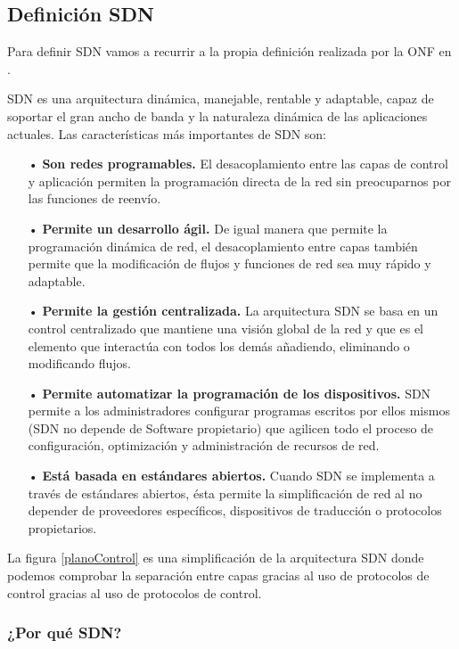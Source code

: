 \documentclass[a4paper,11pt]{book}
\begin{document}
\subsection{Definición SDN}
Para definir \ac{SDN} vamos a recurrir a la propia definición realizada por la \ac{ONF} en \cite{ONFDefinition}\nocite{ONFDefinition}.

\ac{SDN} es una arquitectura dinámica, manejable, rentable y adaptable, capaz de soportar el gran ancho de banda y la naturaleza dinámica de las aplicaciones actuales. Las características más importantes de \ac{SDN} son:

\begin{itemize}
	\item[•] \textbf{Son redes programables.} El desacoplamiento entre las capas de control y aplicación permiten la programación directa de la red sin preocuparnos por las funciones de reenvío.
	\item[•] \textbf{Permite un desarrollo ágil.} De igual manera que permite la programación dinámica de red, el desacoplamiento entre capas también permite que la modificación de flujos y funciones de red sea muy rápido y adaptable.
	\item[•] \textbf{Permite la gestión centralizada.} La arquitectura \ac{SDN} se basa en un control centralizado que mantiene una visión global de la red y que es el elemento que interactúa con todos los demás añadiendo, eliminando o modificando flujos.
	\item[•] \textbf{Permite automatizar la programación de los dispositivos.} \ac{SDN} permite a los administradores configurar programas escritos por ellos mismos (\ac{SDN} no depende de Software propietario) que agilicen todo el proceso de configuración, optimización y administración de recursos de red.
	\item[•] \textbf{Está basada en estándares abiertos.} Cuando \ac{SDN} se implementa a través de estándares abiertos, ésta permite la simplificación de red al no depender de proveedores específicos, dispositivos de traducción o protocolos propietarios.
\end{itemize}

La figura \ref{planoControl} es una simplificación de la arquitectura \ac{SDN} donde podemos comprobar la separación entre capas gracias al uso de protocolos de control gracias al uso de protocolos de control.

\subsubsection{¿Por qué \ac{SDN}?}
\end{document}
